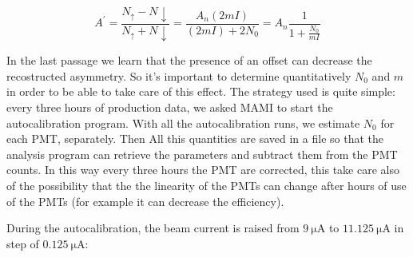 \begin{equation} \label{eq:Systematic}
A^{'} = \dfrac{N_{\uparrow} - N{\downarrow}}{N_{\uparrow} + N{\downarrow}} = \dfrac{A_{n} (2mI)}{ (2mI) + 2N_{0} } = A_{n} \dfrac{1}{1 + \frac{N_{0}}{mI}}
\end{equation} 

In the last passage we learn that the presence of an offset can decrease the recostructed asymmetry. So it's important to determine quantitatively $N_{0}$ and $m$ in order to be able to take care of this effect. The strategy used is quite simple: every three hours of production data, we asked MAMI to start the autocalibration program. With all the autocalibration runs, we estimate $N_{0}$ for each PMT, separately. Then All this quantities are saved in a file so that the analysis program can retrieve the parameters and subtract them from the PMT counts. \medskip
In this way every three hours the PMT are corrected, this take care also of the possibility that the the linearity of the PMTs can change after hours of use of the PMTs (for example it can decrease the efficiency).

During the autocalibration, the beam current is raised from $\SI{9}{\micro \ampere}$ to $\SI{11.125}{\micro \ampere}$ in step of $\SI{0.125}{\micro \ampere}$:

\begin{figure}[ht]
\centering
{}
\end{figure}

